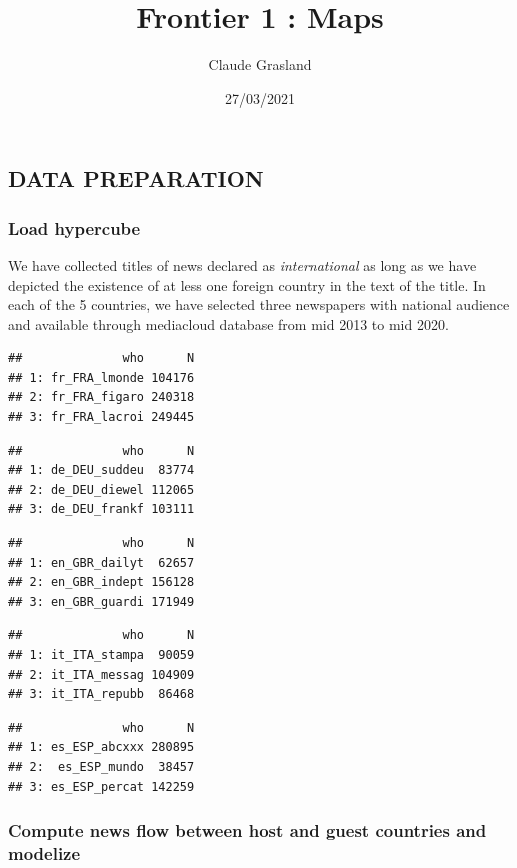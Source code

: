 \documentclass[
]{article}
\title{Frontier 1 : Maps}
\author{Claude Grasland}
\date{27/03/2021}
\begin{document}
\maketitle

\hypertarget{data-preparation}{%
\subsection{DATA PREPARATION}\label{data-preparation}}

\hypertarget{load-hypercube}{%
\subsubsection{Load hypercube}\label{load-hypercube}}

We have collected titles of news declared as \emph{international} as
long as we have depicted the existence of at less one foreign country in
the text of the title. In each of the 5 countries, we have selected
three newspapers with national audience and available through mediacloud
database from mid 2013 to mid 2020.

\begin{verbatim}
##              who      N
## 1: fr_FRA_lmonde 104176
## 2: fr_FRA_figaro 240318
## 3: fr_FRA_lacroi 249445
\end{verbatim}

\begin{verbatim}
##              who      N
## 1: de_DEU_suddeu  83774
## 2: de_DEU_diewel 112065
## 3: de_DEU_frankf 103111
\end{verbatim}

\begin{verbatim}
##              who      N
## 1: en_GBR_dailyt  62657
## 2: en_GBR_indept 156128
## 3: en_GBR_guardi 171949
\end{verbatim}

\begin{verbatim}
##              who      N
## 1: it_ITA_stampa  90059
## 2: it_ITA_messag 104909
## 3: it_ITA_repubb  86468
\end{verbatim}

\begin{verbatim}
##              who      N
## 1: es_ESP_abcxxx 280895
## 2:  es_ESP_mundo  38457
## 3: es_ESP_percat 142259
\end{verbatim}

\hypertarget{compute-news-flow-between-host-and-guest-countries-and-modelize}{%
\subsubsection{Compute news flow between host and guest countries and
modelize}\label{compute-news-flow-between-host-and-guest-countries-and-modelize}}
\end{document}
